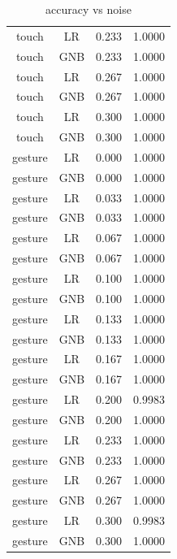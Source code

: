 \begin{table}[h]
\begin{tabular}{|c|c|c|c|}
touch & LR & 0.233 & 1.0000 \\
touch & GNB & 0.233 & 1.0000 \\
touch & LR & 0.267 & 1.0000 \\
touch & GNB & 0.267 & 1.0000 \\
touch & LR & 0.300 & 1.0000 \\
touch & GNB & 0.300 & 1.0000 \\
gesture & LR & 0.000 & 1.0000 \\
gesture & GNB & 0.000 & 1.0000 \\
gesture & LR & 0.033 & 1.0000 \\
gesture & GNB & 0.033 & 1.0000 \\
gesture & LR & 0.067 & 1.0000 \\
gesture & GNB & 0.067 & 1.0000 \\
gesture & LR & 0.100 & 1.0000 \\
gesture & GNB & 0.100 & 1.0000 \\
gesture & LR & 0.133 & 1.0000 \\
gesture & GNB & 0.133 & 1.0000 \\
gesture & LR & 0.167 & 1.0000 \\
gesture & GNB & 0.167 & 1.0000 \\
gesture & LR & 0.200 & 0.9983 \\
gesture & GNB & 0.200 & 1.0000 \\
gesture & LR & 0.233 & 1.0000 \\
gesture & GNB & 0.233 & 1.0000 \\
gesture & LR & 0.267 & 1.0000 \\
gesture & GNB & 0.267 & 1.0000 \\
gesture & LR & 0.300 & 0.9983 \\
gesture & GNB & 0.300 & 1.0000 \\
\hline
\end{tabular}
\caption{accuracy vs noise}
\label{tab:T07}
\end{table}
